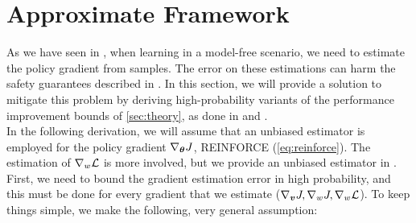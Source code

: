 \section{Approximate Framework}\label{sec:approx}

As we have seen in , when learning in a model-free scenario, we need to estimate the policy gradient from samples. The error on these estimations can harm the safety guarantees described in . In this section, we will provide a solution to mitigate this problem by deriving high-probability variants of the performance improvement bounds of \ref{sec:theory}, as done in \cite{adaptive_step} and \cite{adaptive_batch}. \\
In the following derivation, we will assume that an unbiased estimator is employed for the policy gradient $\nabla_{{\boldsymbol{\theta}}}J$, \eg REINFORCE (\ref{eq:reinforce}). The estimation of $\nabla_{w}\mathcal{L}$ is more involved, but we provide an unbiased estimator in .
%
%
%
%
\\
First, we need to bound the gradient estimation error in high probability, and this must be done for every gradient that we estimate (\eg $\nabla_{\boldsymbol{v}}J, \nabla_wJ, \nabla_w\mathcal{L}$). To keep things simple, we make the following, very general assumption:

